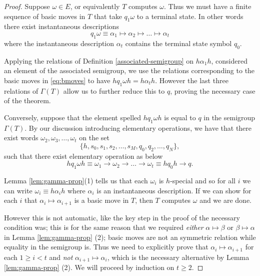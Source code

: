 \begin{proof}
  Suppose $\omega \in E$, or equivalently $T$ computes $\omega$. Thus we must have a finite sequence of basic moves in $T$ that take $q_1\omega$ to a terminal state. In other words there exist instantaneous descriptions
  \begin{equation}
    \label{eq:bmoves}
    q_1\omega \equiv \alpha_1 \mapsto \alpha_2 \mapsto \dots \mapsto \alpha_t
  \end{equation}
  where the instantaneous description $\alpha_t$ contains the terminal state symbol $q_0$.

  Applying the relations of Definition \ref{associated-semigroup} on $h\alpha_1 h$, considered an element of the associated semigroup, we use the relations corresponding to the basic moves in \ref{eq:bmoves} to have $hq_1\omega h = h \alpha_t h$. However the last three relations of $\Gamma(T)$ allow us to further reduce this to $q$, proving the necessary case of the theorem.

  Conversely, suppose that the element spelled $hq_1\omega h$ is equal to $q$ in the semigroup $\Gamma(T)$. By our discussion introducing elementary operations, we have that there exist words $\omega_2, \omega_3,\dots, \omega_t$ on the set
  \begin{equation*}
    \{ h,s_0,s_1,s_2, \dots, s_M, q_0, q_2, \dots, q_N \},
  \end{equation*}
such that there exist elementary operation as below
  \begin{equation*}
    hq_1 \omega h \equiv \omega_1 \rightarrow \omega_2 \rightarrow \dots \rightarrow \omega_t \equiv h q_0 h \rightarrow q.
  \end{equation*}

  Lemma \ref{lem:gamma-prop}(1) tells us that each $\omega_i$ is $h$-special and so for all $i$ we can write $\omega_i \equiv h \alpha_i h$ where $\alpha_i$ is an instantaneous description. If we can show for each $i$ that $\alpha_i \mapsto \alpha_{i+1}$ is a basic move in $T$, then $T$ computes $\omega$ and we are done.

  However this is not automatic, like the key step in the proof of the necessary condition was; this is for the same reason that we required \emph{either} $\alpha \mapsto \beta$ or $\beta \mapsto \alpha$ in Lemma \ref{lem:gamma-prop} (2); basic moves are not an symmetric relation while equality in the semigroup is. Thus we need to explicitly prove that $\alpha_i \mapsto \alpha_{i+1}$ for each $1 \geq i <t$ and \emph{not} $\alpha_{i+1} \mapsto \alpha_i$, which is the necessary alternative by Lemma \ref{lem:gamma-prop} (2). We will proceed by induction on $t \geq 2$.


\end{proof}
